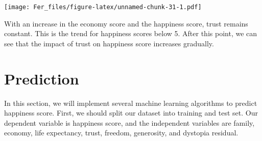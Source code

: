 \documentclass[
]{article}
\newenvironment{Shaded}{\begin{snugshade}}{\end{snugshade}}
\newcommand{\AttributeTok}[1]{\textcolor[rgb]{0.13,0.29,0.53}{#1}}
\newcommand{\CommentTok}[1]{\textcolor[rgb]{0.56,0.35,0.01}{\textit{#1}}}
\newcommand{\ConstantTok}[1]{\textcolor[rgb]{0.56,0.35,0.01}{#1}}
\newcommand{\DecValTok}[1]{\textcolor[rgb]{0.00,0.00,0.81}{#1}}
\newcommand{\FloatTok}[1]{\textcolor[rgb]{0.00,0.00,0.81}{#1}}
\newcommand{\FunctionTok}[1]{\textcolor[rgb]{0.13,0.29,0.53}{\textbf{#1}}}
\newcommand{\NormalTok}[1]{#1}
\newcommand{\OtherTok}[1]{\textcolor[rgb]{0.56,0.35,0.01}{#1}}
\newcommand{\SpecialCharTok}[1]{\textcolor[rgb]{0.81,0.36,0.00}{\textbf{#1}}}
\newcommand{\StringTok}[1]{\textcolor[rgb]{0.31,0.60,0.02}{#1}}
\begin{document}
\begin{Shaded}
\end{Shaded}

\texttt{[image: Fer\_files/figure-latex/unnamed-chunk-31-1.pdf]}

With an increase in the economy score and the happiness score, trust
remains constant. This is the trend for happiness scores below 5. After
this point, we can see that the impact of trust on happiness score
increases gradually.

\section{Prediction}\label{prediction}

In this section, we will implement several machine learning algorithms
to predict happiness score. First, we should split our dataset into
training and test set. Our dependent variable is happiness score, and
the independent variables are family, economy, life expectancy, trust,
freedom, generosity, and dystopia residual.

\begin{Shaded}
\end{Shaded}
\end{document}
